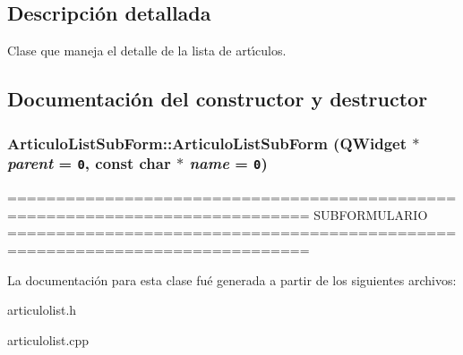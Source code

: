 \subsection{Descripci\'{o}n detallada}
Clase que maneja el detalle de la lista de art\'{\i}culos. 



\subsection{Documentaci\'{o}n del constructor y destructor}
\subsubsection{\setlength{\rightskip}{0pt plus 5cm}Articulo\-List\-Sub\-Form::Articulo\-List\-Sub\-Form (QWidget $\ast$ {\em parent} = {\tt 0}, const char $\ast$ {\em name} = {\tt 0})}\label{classArticuloListSubForm_a0}


============================================================================= SUBFORMULARIO ============================================================================= 

La documentaci\'{o}n para esta clase fu\'{e} generada a partir de los siguientes archivos:\begin{CompactItemize}
\item 
articulolist.h\item 
articulolist.cpp\end{CompactItemize}
